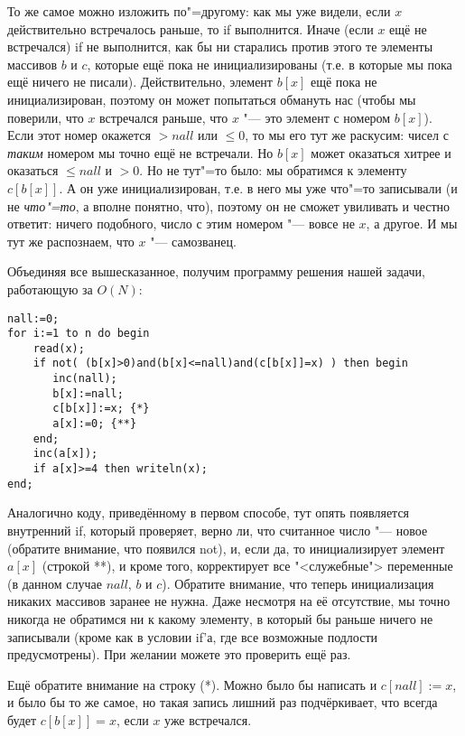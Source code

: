 То же самое можно изложить по"=другому: как мы уже видели, если $x$ действительно встречалось 
раньше, то if выполнится. Иначе (если $x$ ещё не встречался) if не выполнится, как бы ни старались против этого те элементы 
массивов $b$ и $c$, которые ещё пока не инициализированы (т.е. в которые мы пока ещё ничего не 
писали). Действительно, элемент $b[x]$ ещё пока не инициализирован, поэтому он может попытаться 
обмануть нас (чтобы мы поверили, что $x$ встречался раньше, что $x$ "--- это элемент с номером $b[x]$).  
Если этот номер окажется $>nall$ или $\leq 0$, то мы его тут же раскусим: чисел с \textit{таким} номером мы 
точно ещё не встречали. Но $b[x]$ может оказаться хитрее и оказаться $\leq nall$ и $>0$. Но не тут"=то 
было: мы обратимся к элементу $c[b[x]]$. А он уже инициализирован, т.е. в него мы уже что"=то 
записывали (и не \textit{что"=то}, а вполне понятно, что), поэтому он не сможет увиливать и честно 
ответит: ничего подобного, число с этим номером "--- вовсе не $x$, а другое. И мы тут же 
распознаем, что $x$ "--- самозванец.

Объединяя все вышесказанное, получим программу решения нашей задачи, работающую за 
$O(N)$:
\begin{codesampleo}\begin{verbatim}
nall:=0;
for i:=1 to n do begin
    read(x);
    if not( (b[x]>0)and(b[x]<=nall)and(c[b[x]]=x) ) then begin
       inc(nall);
       b[x]:=nall;
       c[b[x]]:=x; {*}
       a[x]:=0; {**}
    end;
    inc(a[x]);
    if a[x]>=4 then writeln(x);
end;
\end{verbatim}\end{codesampleo}

Аналогично коду, приведённому в первом способе, тут опять появляется внутренний if, который 
проверяет, верно ли, что считанное число "--- новое (обратите внимание, что появился not), и, если 
да, то инициализирует элемент $a[x]$ (строкой **), и кроме того, корректирует все 
"<служебные"> переменные (в данном случае $nall$, $b$ и $c$). Обратите внимание, что теперь 
инициализация никаких массивов заранее не нужна. Даже несмотря на её отсутствие, мы точно никогда 
не обратимся ни к какому элементу, в который бы раньше ничего не записывали (кроме как в условии 
if'а, где все возможные подлости предусмотрены). При желании можете это проверить ещё раз.

Ещё обратите внимание на строку (*). Можно было бы написать и $c[nall]:=x$, и было бы то же самое, 
но такая запись лишний раз подчёркивает, что всегда будет $c[b[x]]=x$, если $x$ уже встречался.

